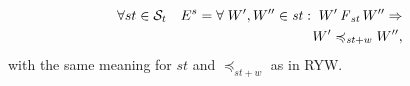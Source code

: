 \documentclass[journal,compsoc]{IEEEtran}
\begin{document}
  \begin{align}\label{eqn:MW}
\begin{split}
\forall st \in \mathcal{S}_t \quad E^{s} = \forall \; {W}', {W}'' \in \mathit{st} : \; {W}' \operatorname{\it F}_\mathit{st} {W}''  \Rightarrow \\ {W}' \preccurlyeq_{\mathit{st}+w} {W}'' , %
\end{split}
  \end{align} with the same meaning for $\mathit{st}$ and $\preccurlyeq_{\mathit{st}+w}$ as in RYW.
\end{document}
